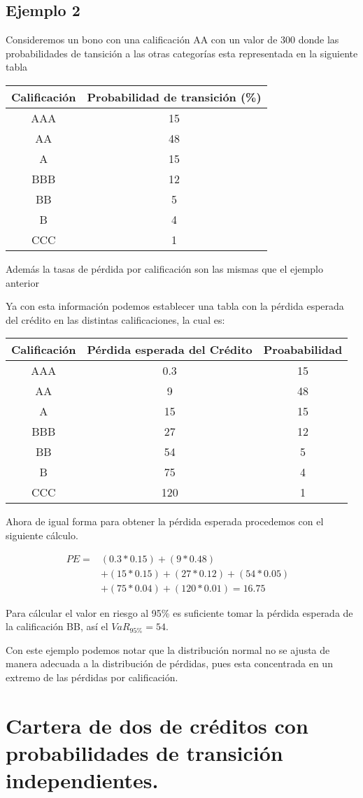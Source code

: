\documentclass[
  12pt,
]{krantz}
\theoremstyle{definition}
\theoremstyle{definition}
\theoremstyle{definition}
\theoremstyle{remark}
\begin{document}
\hypertarget{ejemplo-2}{%
\subsection{Ejemplo 2}\label{ejemplo-2}}

Consideremos un bono con una calificación AA con un valor de 300 donde las probabilidades de tansición a las otras categorías esta representada en la siguiente tabla

\begin{longtable}[]{@{}cc@{}}
\toprule
Calificación & Probabilidad de transición (\%)\tabularnewline
\midrule
\endhead
AAA & 15\tabularnewline
AA & 48\tabularnewline
A & 15\tabularnewline
BBB & 12\tabularnewline
BB & 5\tabularnewline
B & 4\tabularnewline
CCC & 1\tabularnewline
\bottomrule
\end{longtable}

Además la tasas de pérdida por calificación son las mismas que el ejemplo anterior

Ya con esta información podemos establecer una tabla con la pérdida esperada del crédito en las distintas calificaciones, la cual es:

\begin{longtable}[]{@{}ccc@{}}
\toprule
Calificación & Pérdida esperada del Crédito & Proababilidad\tabularnewline
\midrule
\endhead
AAA & 0.3 & 15\tabularnewline
AA & 9 & 48\tabularnewline
A & 15 & 15\tabularnewline
BBB & 27 & 12\tabularnewline
BB & 54 & 5\tabularnewline
B & 75 & 4\tabularnewline
CCC & 120 & 1\tabularnewline
\bottomrule
\end{longtable}

Ahora de igual forma para obtener la pérdida esperada procedemos con el siguiente cálculo.

\begin{align*} 
PE = & (0.3*0.15)+(9*0.48)& \\
&+(15*0.15)+(27*0.12)+(54*0.05)&\\
&+(75*0.04) +(120*0.01)=16.75
\end{align*}

Para cálcular el valor en riesgo al 95\% es suficiente tomar la pérdida esperada de la calificación BB, así el \(VaR_{95\%}=54\).

Con este ejemplo podemos notar que la distribución normal no se ajusta de manera adecuada a la distribución de pérdidas, pues esta concentrada en un extremo de las pérdidas por calificación.

\hypertarget{cartera-de-dos-de-creditos-con-probabilidades-de-transicion-independientes.}{%
\section{Cartera de dos de créditos con probabilidades de transición independientes.}\label{cartera-de-dos-de-creditos-con-probabilidades-de-transicion-independientes.}}
\end{document}
